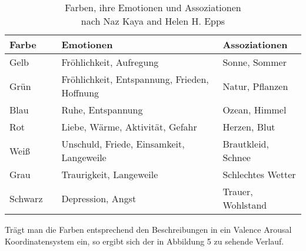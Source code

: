 \documentclass[11pt,a4paper]{article}
\begin{document}
\begin{center}
\begin{table}[h!]
\begin{tabular}{l | l | l | l}
\textbf{Farbe} & & \textbf{Emotionen} & \textbf{Assoziationen}\\
\hline
Gelb & \cellcolor{yellow_color} & Fröhlichkeit, Aufregung & Sonne, Sommer \\
Grün & \cellcolor{green_color} & Fröhlichkeit, Entspannung, Frieden, Hoffnung & Natur, Pflanzen \\
Blau & \cellcolor{blue_color} & Ruhe, Entspannung & Ozean, Himmel \\
Rot & \cellcolor{red_color} & Liebe, Wärme, Aktivität, Gefahr & Herzen, Blut \\
Weiß & \cellcolor{white_color} & Unschuld, Friede, Einsamkeit, Langeweile & Brautkleid, Schnee \\
Grau & \cellcolor{gray_color} & Traurigkeit, Langeweile & Schlechtes Wetter \\
Schwarz & \cellcolor{black_color} & Depression, Angst & Trauer, Wohlstand \\

\end{tabular}
\captionsetup{justification=centering}
\caption[Farben Emotionen Assoziationen]{Farben, ihre Emotionen und Assoziationen\\nach Naz Kaya and Helen H. Epps
 \cite{c0f471f7e6a618d880cf25175c9f99ac97ef8ba7d016c7f8c523f8d902892d9e}}

\end{table}
\end{center}
Trägt man die Farben entsprechend den Beschreibungen in ein Valence Arousal Koordinatensystem ein, so ergibt sich der in Abbildung 5 zu sehende Verlauf.
\end{document}
